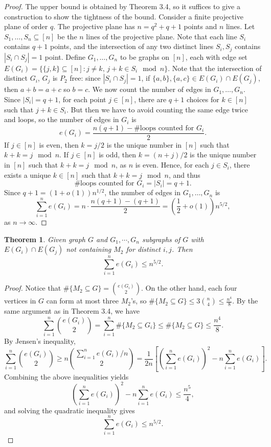 \documentclass[12pt]{report}
\newtheorem{theorem}{Theorem}[chapter]
\begin{document}
\begin{proof}
  The upper bound is obtained by Theorem 3.4, so it suffices to give a construction to show the
  tightness of the bound. Consider a finite projective plane of order $q$. The projective plane has
  $n = q^2 + q + 1$ points and $n$ lines. Let $S_1, \ldots, S_n \subseteq [n]$ be the $n$ lines of
  the projective plane. Note that each line $S_i$ contains $q + 1$ points, and the intersection of
  any two distinct lines $S_i, S_j$ contains $|S_i \cap S_j| = 1$ point. Define $G_1, \ldots, G_n$
  to be graphs on $[n]$, each with edge set $E(G_i) = \{\{j, k\} \subseteq [n] : j \neq k, \, j + k
  \in S_i \mod n\}$. Note that the intersection of distinct $G_i$, $G_j$ is $P_2$ free: since $|S_i
  \cap S_j| = 1$, if $\{a, b\}, \{a, c\} \in E(G_i) \cap E(G_j)$, then $a + b = a + c$ so $b = c$.
  We now count the number of edges in $G_1, \ldots, G_n$. Since $|S_i| = q + 1$, for each point $j
  \in [n]$, there are $q + 1$ choices for $k \in [n]$ such that $j + k \in S_i$. But then we have to
  avoid counting the same edge twice and loops, so the number of edges in $G_i$ is
  \[
    e(G_i) = \frac{n(q + 1) - \#\text{loops counted for } G_i}{2}.
  \]
  If $j \in [n]$ is even, then $k = j/2$ is the unique number in $[n]$ such that $k + k = j \mod n$.
  If $j \in [n]$ is odd, then $k = (n + j)/2$ is the unique number in $[n]$ such that $k + k = j
  \mod n$, as $n$ is even. Hence, for each $j \in S_i$, there exists a unique $k \in [n]$ such that
  $k + k = j \mod n$, and thus
  \[
    \#\text{loops counted for } G_i = |S_i| = q + 1.
  \]
  Since $q + 1 = (1 + o(1))n^{1/2}$, the number of edges in $G_1, \ldots, G_n$ is
  \[
    \sum_{i = 1}^n e(G_i) = n \cdot \frac{n(q + 1) - (q + 1)}{2} = \left(\frac{1}{2} + o(1)\right)n^{5/2},
  \]
  as $n \to \infty$.
\end{proof}

\begin{theorem}
  Given graph $G$ and $G_1, \cdots, G_n$ subgraphs of $G$ with $E(G_i) \cap E(G_j)$ not containing
  $M_2$ for distinct $i, j$. Then
  \[
    \sum_{i = 1}^n e(G_i) \leq n^{5/2}.
  \]
\end{theorem}

\begin{proof}
  Notice that $\#\{M_2 \subseteq G\} = \binom{e(G_i)}{2}$. On the other hand, each four vertices in
  $G$ can form at most three $M_2$'s, so $\#\{M_2 \subseteq G\} \leq 3\binom{n}{4} \leq
  \frac{n^4}{8}$. By the same argument as in Theorem 3.4, we have 
  \[
    \sum_{i = 1}^n \binom{e(G_i)}{2} = \sum_{i = 1}^n \#\{M_2 \subseteq G_i\} \leq \#\{M_2 \subseteq G\} \leq \frac{n^4}{8}.
  \]
  By Jensen's inequality,
  \[
    \sum_{i = 1}^n \binom{e(G_i)}{2} \geq n\binom{\sum_{i = 1}^n e(G_i)/n}{2} = \frac{1}{2n}\left[\left(\sum_{i = 1}^n e(G_i)\right)^2 - n\sum_{i = 1}^n e(G_i)\right].
  \]
  Combining the above inequalities yields
  \[
    \left(\sum_{i = 1}^n e(G_i)\right)^2 - n\sum_{i = 1}^n e(G_i) \leq \frac{n^5}{4},
  \]
  and solving the quadratic inequality gives
  \[
    \sum_{i = 1}^n e(G_i) \leq n^{5/2}.
  \]
\end{proof}
\end{document}
